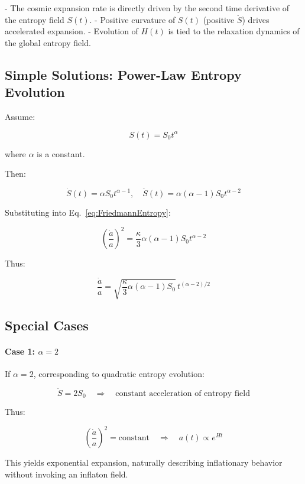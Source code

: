 \documentclass{article}
\begin{document}
- The cosmic expansion rate is directly driven by the second time derivative of the entropy field $S(t)$.
- Positive curvature of $S(t)$ (positive $\ddot{S}$) drives accelerated expansion.
- Evolution of $H(t)$ is tied to the relaxation dynamics of the global entropy field.

\subsection{Simple Solutions: Power-Law Entropy Evolution}

Assume:

\begin{equation}
S(t) = S_0 t^\alpha
\end{equation}

where $\alpha$ is a constant.

Then:

\[
\dot{S}(t) = \alpha S_0 t^{\alpha-1}, \quad \ddot{S}(t) = \alpha(\alpha-1) S_0 t^{\alpha-2}
\]

Substituting into Eq.~\eqref{eq:FriedmannEntropy}:

\begin{equation}
\left( \frac{\dot{a}}{a} \right)^2 = \frac{\kappa}{3} \alpha(\alpha-1) S_0 t^{\alpha-2}
\end{equation}

Thus:

\begin{equation}
\frac{\dot{a}}{a} = \sqrt{ \frac{\kappa}{3} \alpha(\alpha-1) S_0 } \, t^{(\alpha-2)/2}
\end{equation}

\subsection{Special Cases}

\paragraph{Case 1: $\alpha = 2$}

If $\alpha = 2$, corresponding to quadratic entropy evolution:

\[
\ddot{S} = 2S_0
\quad \Rightarrow \quad \text{constant acceleration of entropy field}
\]

Thus:

\[
\left( \frac{\dot{a}}{a} \right)^2 = \text{constant}
\quad \Rightarrow \quad a(t) \propto e^{Ht}
\]

This yields exponential expansion, naturally describing inflationary behavior without invoking an inflaton field.
\end{document}
